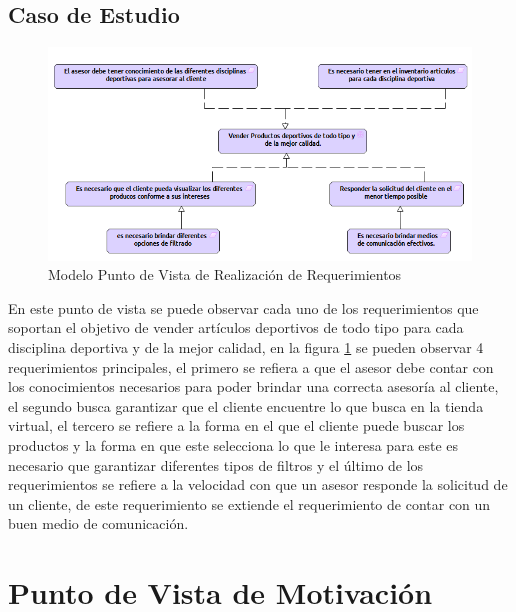 \subsection{Caso de Estudio}

\begin{figure}[th!]
	\centering
	\includegraphics[width=0.7\linewidth]{arquitectura/imagenes/PuntoVistaRealizacionRequerimientos}
	\caption{Modelo Punto de Vista de Realización de Requerimientos}
	\label{modelo realizacion requerimientos}
\end{figure}

En este punto de vista se puede observar cada uno de los requerimientos que soportan el objetivo de vender artículos deportivos de todo tipo para cada disciplina deportiva y de la mejor calidad, en la figura \ref{modelo realizacion requerimientos} se pueden observar 4 requerimientos principales, el primero se refiera a que el asesor debe contar con los conocimientos necesarios para poder brindar una correcta asesoría al cliente, el segundo busca garantizar que el cliente encuentre lo que busca en la tienda virtual, el tercero se refiere a la forma en el que el cliente puede buscar los productos y la forma en que este selecciona lo que le interesa para este es necesario que garantizar diferentes tipos de filtros y el último de los requerimientos se refiere a la velocidad con que un asesor responde la solicitud de un cliente, de este requerimiento se extiende el requerimiento de contar con un buen medio de comunicación.
\newpage

\section{Punto de Vista de Motivación}


